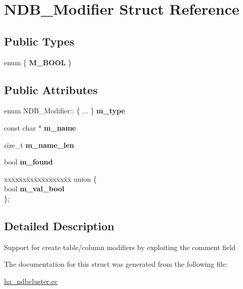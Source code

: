 \hypertarget{structNDB__Modifier}{}\section{N\+D\+B\+\_\+\+Modifier Struct Reference}
\label{structNDB__Modifier}
\subsection*{Public Types}
\begin{DoxyCompactItemize}
\item 
\mbox{\label{structNDB__Modifier_a98717e9146db326764b6d610c2d375ab}} 
enum \{ {\bfseries M\+\_\+\+B\+O\+OL}
 \}
\end{DoxyCompactItemize}
\subsection*{Public Attributes}
\begin{DoxyCompactItemize}
\item 
\mbox{\label{structNDB__Modifier_adffaefeab8900249cc8cf1eb3df4cd3c}} 
enum N\+D\+B\+\_\+\+Modifier\+:: \{ ... \}  {\bfseries m\+\_\+type}
\item 
\mbox{\label{structNDB__Modifier_aac815f67d76420da95f1d7b4d23b4441}} 
const char $\ast$ {\bfseries m\+\_\+name}
\item 
\mbox{\label{structNDB__Modifier_ac0f891cacefc1ff66e95a203e7278318}} 
size\+\_\+t {\bfseries m\+\_\+name\+\_\+len}
\item 
\mbox{\label{structNDB__Modifier_a0bba23815ea49166bc3f685b13a2faa7}} 
bool {\bfseries m\+\_\+found}
\item 
\mbox{\label{structNDB__Modifier_a9807315f28b56f78c1495f6374bac09a}} 
\begin{tabbing}
xx\=xx\=xx\=xx\=xx\=xx\=xx\=xx\=xx\=\kill
union \{\\
\>bool {\bfseries m\_val\_bool}\\
\}; \\

\end{tabbing}\end{DoxyCompactItemize}


\subsection{Detailed Description}
Support for create table/column modifiers by exploiting the comment field 

The documentation for this struct was generated from the following file\+:\begin{DoxyCompactItemize}
\item 
\mbox{\hyperlink{ha__ndbcluster_8cc}{ha\+\_\+ndbcluster.\+cc}}\end{DoxyCompactItemize}
